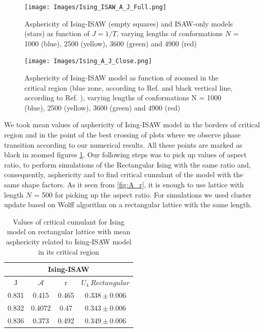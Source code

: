 \documentclass[a4paper]{jpconf}
\begin{document}
\begin{figure}[h!]
    \begin{minipage}{0.48\textwidth}
        \texttt{[image: Images/Ising\_ISAW\_A\_J\_Full.png]}
        \caption{Asphericity of Ising-ISAW (empty squares) and ISAW-only models (stars) as function of $J=1/T$, varying lengths of conformations $N$ = 1000 (blue), 2500 (yellow), 3600 (green) and 4900 (red)}
        \label{fig:Ising&ISAW_A_J}
    \end{minipage}
    \hfill
    \begin{minipage}{0.48\textwidth}
        \texttt{[image: Images/Ising\_A\_J\_Close.png]}
        \caption{Asphericity of Ising-ISAW model as function of zoomed in the critical region (blue zone, according to Ref. \cite{Foster2021} and black vertical line, according to Ref. \cite{faizullina2021critical}), varying lengths of conformations N = 1000 (blue), 2500 (yellow), 3600 (green) and 4900 (red)}
        \label{fig:Ising_A_J}
    \end{minipage}
\end{figure}

\begin{figure}[h!]
    \centering
    
\end{figure}

We took mean values of asphericity of Ising-ISAW model in the borders of critical region and in the point of the best crossing of plots where we observe phase transition according to our numerical results. All these points are marked as black in zoomed figures \ref{fig:Ising_A_J}. Our following steps was to pick up values of aspect ratio, to perform simulations of the Rectangular Ising with the same ratio and, consequently, asphericity and to find critical cumulant of the model with the same shape factors. As it seen from \cref{fig:A_r}, it is enough to use lattice with length $N$ = 500 for picking up the aspect ratio. For simulations we used cluster update based on Wolff algorithm \cite{Newmanb1999} on a rectangular lattice with the same length.\\

\begin{table}[h]
    \centering
    \begin{tabular}{|c|c|c|c|}
        \hline
         \multicolumn{4}{|c|}{Ising-ISAW}  \\ \hline
         J & $\mathcal{A}$ & r & $U_{4}\  Rectangular$ \\ \hline
         0.831 & 0.415 & 0.465 & $0.338 \pm 0.006$\\ \hline
         0.832 & 0.4072 & 0.47 & $0.343 \pm 0.006$\\ \hline
         0.836 & 0.373 & 0.492 & $0.349 \pm 0.006$\\ \hline
         \end{tabular}
    \caption{Values of critical cumulant for Ising model on rectangular lattice with mean asphericity related to Ising-ISAW model in its critical region}
    \label{tab:A_r_U}
\end{table}
\end{document}
